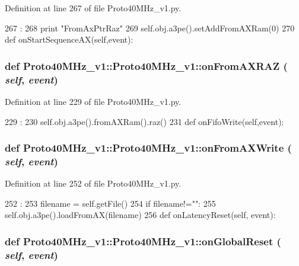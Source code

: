 Definition at line 267 of file Proto40MHz\_\-v1.py.


\begin{DoxyCode}
267                                    :
268         print "FromAxPtrRaz"
269         self.obj.a3pe().setAddFromAXRam(0)
270 
    def onStartSequenceAX(self,event):
\end{DoxyCode}
\hypertarget{classProto40MHz__v1_1_1Proto40MHz__v1_a2e052d6647452980c2aba101d70caeb6}{
\subsubsection[{onFromAXRAZ}]{\setlength{\rightskip}{0pt plus 5cm}def Proto40MHz\_\-v1::Proto40MHz\_\-v1::onFromAXRAZ ( {\em self}, \/   {\em event})}}
\label{classProto40MHz__v1_1_1Proto40MHz__v1_a2e052d6647452980c2aba101d70caeb6}


Definition at line 229 of file Proto40MHz\_\-v1.py.


\begin{DoxyCode}
229                                 :
230         self.obj.a3pe().fromAXRam().raz()
231 
    def onFifoWrite(self,event):
\end{DoxyCode}
\hypertarget{classProto40MHz__v1_1_1Proto40MHz__v1_af108507ac84dce73040e8e66c9e37a94}{
\subsubsection[{onFromAXWrite}]{\setlength{\rightskip}{0pt plus 5cm}def Proto40MHz\_\-v1::Proto40MHz\_\-v1::onFromAXWrite ( {\em self}, \/   {\em event})}}
\label{classProto40MHz__v1_1_1Proto40MHz__v1_af108507ac84dce73040e8e66c9e37a94}


Definition at line 252 of file Proto40MHz\_\-v1.py.


\begin{DoxyCode}
252                                  :
253         filename = self.getFile()
254         if filename!="":
255             self.obj.a3pe().loadFromAX(filename)
256 
    def onLatencyReset(self, event):
\end{DoxyCode}
\hypertarget{classProto40MHz__v1_1_1Proto40MHz__v1_a4cbdb85346b4a33b4374a65c539f5f24}{
\subsubsection[{onGlobalReset}]{\setlength{\rightskip}{0pt plus 5cm}def Proto40MHz\_\-v1::Proto40MHz\_\-v1::onGlobalReset ( {\em self}, \/   {\em event})}}
\label{classProto40MHz__v1_1_1Proto40MHz__v1_a4cbdb85346b4a33b4374a65c539f5f24}


